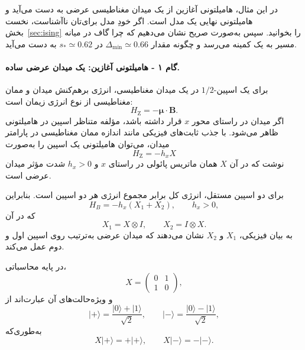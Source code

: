 در این مثال، هامیلتونی آغازین از یک میدان مغناطیسی عرضی به دست می‌آید و هامیلتونی نهایی یک مدل  است. اگر خودِ مدل برای‌تان ناآشناست، نخست بخش~\ref{sec:ising} را بخوانید. سپس به‌صورت صریح نشان می‌دهیم که چرا گاف در میانه مسیر به یک کمینه می‌رسد و چگونه مقدار
$\Delta_{\min}\simeq0.66$
در
$s_*\simeq0.62$
به دست می‌آید.

\paragraph{گام ۱ - هامیلتونی آغازین: یک میدان عرضی ساده.}

برای یک اسپین-$1/2$ در یک میدان مغناطیسی، انرژی برهم‌کنش میدان و ممان مغناطیسی از نوع انرژی زیمان است:
\begin{equation}
	H_{\mathrm{Z}}=-\boldsymbol{\mu}\cdot\mathbf{B}.
\end{equation}
اگر میدان در راستای محور $x$ قرار داشته باشد، مؤلفه متناظر اسپین در هامیلتونی ظاهر می‌شود. با جذب ثابت‌های فیزیکی مانند اندازه ممان مغناطیسی در پارامتر میدان، می‌توان هامیلتونی یک اسپین را به‌صورت
\begin{equation}
	H_{\mathrm{Z}}=-h_x X
\end{equation}
نوشت که در آن $X$ همان ماتریس پائولی در راستای $x$ و $h_x>0$ شدت مؤثر میدان عرضی است.

برای دو اسپین مستقل، انرژی کل برابر مجموع انرژی هر دو اسپین است. بنابراین
\begin{equation}
	\label{eq:HB}
	H_B=-h_x(X_1+X_2),
	\qquad h_x>0,
\end{equation}
که در آن
\begin{equation}
	X_1=X\otimes I,
	\qquad
	X_2=I\otimes X.
\end{equation}
به بیان فیزیکی، $X_1$ و $X_2$ نشان می‌دهند که میدان عرضی به‌ترتیب روی اسپین اول و دوم عمل می‌کند.

در پایه محاسباتی،
\begin{equation}
	X=
	\begin{pmatrix}
		0&1\\
		1&0
	\end{pmatrix},
\end{equation}
و ویژه‌حالت‌های آن عبارت‌اند از
\begin{equation}
	\lvert+\rangle
	=
	\frac{\lvert0\rangle+\lvert1\rangle}{\sqrt{2}},
	\qquad
	\lvert-\rangle
	=
	\frac{\lvert0\rangle-\lvert1\rangle}{\sqrt{2}},
\end{equation}
به‌طوری‌که
\begin{equation}
	X\lvert+\rangle=+\lvert+\rangle,
	\qquad
	X\lvert-\rangle=-\lvert-\rangle.
\end{equation}

